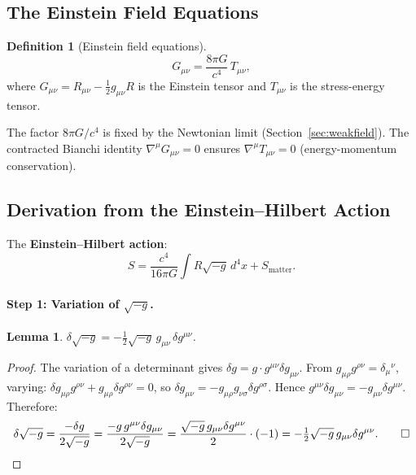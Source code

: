 \documentclass[12pt,a4paper]{article}
\theoremstyle{plain}
\newtheorem{lemma}[theorem]{Lemma}
\theoremstyle{definition}
\newtheorem{definition}[theorem]{Definition}
\theoremstyle{remark}
\begin{document}
\subsection{The Einstein Field Equations}

\begin{definition}[Einstein field equations]
\[
  \boxed{G_{\mu\nu} = \frac{8\pi G}{c^4}\,T_{\mu\nu},}
\]
where $G_{\mu\nu} = R_{\mu\nu}-\tfrac{1}{2}g_{\mu\nu}R$ is the Einstein tensor and $T_{\mu\nu}$ is the stress-energy tensor.
\end{definition}

The factor $8\pi G/c^4$ is fixed by the Newtonian limit (Section~\ref{sec:weakfield}). The contracted Bianchi identity $\nabla^\mu G_{\mu\nu}=0$ ensures $\nabla^\mu T_{\mu\nu}=0$ (energy-momentum conservation).

\subsection{Derivation from the Einstein--Hilbert Action}

The \textbf{Einstein--Hilbert action}:
\[
  S = \frac{c^4}{16\pi G}\int R\sqrt{-g}\,d^4x + S_{\mathrm{matter}}.
\]

\paragraph{Step 1: Variation of $\sqrt{-g}$.}

\begin{lemma}\label{lem:sqrtg}
$\delta\sqrt{-g} = -\tfrac{1}{2}\sqrt{-g}\,g_{\mu\nu}\,\delta g^{\mu\nu}$.
\end{lemma}
\begin{proof}
The variation of a determinant gives $\delta g = g\cdot g^{\mu\nu}\delta g_{\mu\nu}$. From $g_{\mu\rho}g^{\rho\nu}=\delta_\mu{}^\nu$, varying: $\delta g_{\mu\rho}g^{\rho\nu}+g_{\mu\rho}\delta g^{\rho\nu}=0$, so $\delta g_{\mu\nu} = -g_{\mu\rho}g_{\nu\sigma}\delta g^{\rho\sigma}$. Hence $g^{\mu\nu}\delta g_{\mu\nu} = -g_{\mu\nu}\delta g^{\mu\nu}$. Therefore:
\[
  \delta\sqrt{-g}
  = \frac{-\delta g}{2\sqrt{-g}}
  = \frac{-g\,g^{\mu\nu}\delta g_{\mu\nu}}{2\sqrt{-g}}
  = \frac{\sqrt{-g}\,g_{\mu\nu}\delta g^{\mu\nu}}{2}\cdot(-1)
  = -\tfrac{1}{2}\sqrt{-g}\,g_{\mu\nu}\delta g^{\mu\nu}. \qed
\]
\end{proof}
\end{document}
